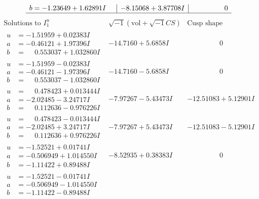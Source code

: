 \documentclass[1p]{elsarticle_modified}
\theoremstyle{definition}
\newcommand{\I}{\sqrt{-1}}
\begin{document}
$$\begin{array}{c|c|c}
\begin{aligned}
b &= -1.23649 + 1.62891 I\end{aligned}
 & -8.15068 + 3.87708 I & \phantom{-0.000000 } 0\\
 \hline 
 \end{array}$$\newpage$$\begin{array}{c|c|c}  
\text{Solutions to }I^u_{1}& \I (\text{vol} + \sqrt{-1}CS) & \text{Cusp shape}\\
 \hline 
\begin{aligned}
u &= -1.51959 + 0.02383 I \\
a &= -0.46121 + 1.97396 I \\
b &= \phantom{-}0.553037 + 1.032860 I\end{aligned}
 & -14.7160 + 5.6858 I & \phantom{-0.000000 } 0 \\ \hline\begin{aligned}
u &= -1.51959 - 0.02383 I \\
a &= -0.46121 - 1.97396 I \\
b &= \phantom{-}0.553037 - 1.032860 I\end{aligned}
 & -14.7160 - 5.6858 I & \phantom{-0.000000 } 0 \\ \hline\begin{aligned}
u &= \phantom{-}0.478423 + 0.013444 I \\
a &= -2.02485 - 3.24717 I \\
b &= \phantom{-}0.112636 - 0.976226 I\end{aligned}
 & -7.97267 - 5.43473 I & -12.51083 + 5.12901 I \\ \hline\begin{aligned}
u &= \phantom{-}0.478423 - 0.013444 I \\
a &= -2.02485 + 3.24717 I \\
b &= \phantom{-}0.112636 + 0.976226 I\end{aligned}
 & -7.97267 + 5.43473 I & -12.51083 - 5.12901 I \\ \hline\begin{aligned}
u &= -1.52521 + 0.01741 I \\
a &= -0.506949 + 1.014550 I \\
b &= -1.11422 + 0.89488 I\end{aligned}
 & -8.52935 + 0.38383 I & \phantom{-0.000000 } 0 \\ \hline\begin{aligned}
u &= -1.52521 - 0.01741 I \\
a &= -0.506949 - 1.014550 I \\
b &= -1.11422 - 0.89488 I\end{aligned}

\end{array}$$
\end{document}
